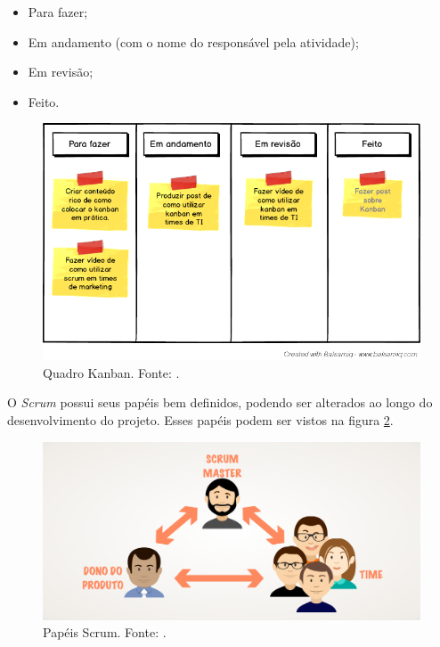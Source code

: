 \begin{itemize}
	\item Para fazer;
	\item Em andamento (com o nome do responsável pela atividade);
	\item Em revisão;
	\item Feito.
\end{itemize}

\begin{figure}[H]
	\centering
	\includegraphics[width=1.0\textwidth]{figuras/kanban.png}
	\caption{Quadro Kanban. Fonte: \cite{kanban}.}
	\label{img:kanban}
\end{figure}

O \textit{Scrum} possui seus papéis bem definidos, podendo ser alterados ao longo do desenvolvimento do projeto. Esses papéis podem ser vistos na figura \ref{img:papeis_scrum}.

\begin{figure}[H]
	\centering
	\includegraphics[width=1.0\textwidth]{figuras/papeis_scrum.png}
	\caption{Papéis Scrum. Fonte: \cite{papeis_scrum}.}
	\label{img:papeis_scrum}
\end{figure}

